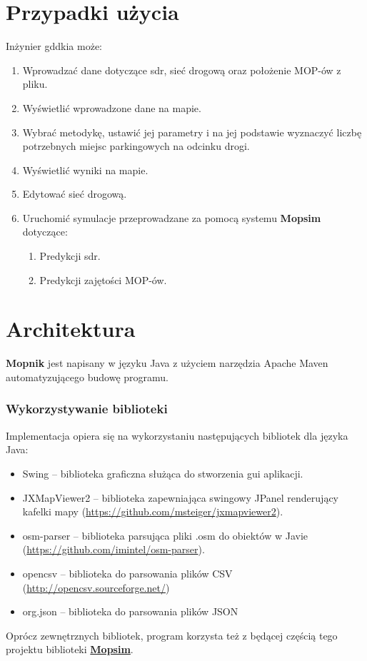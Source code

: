 \section{Przypadki użycia}
Inżynier \acrshort{gddkia} może:
\begin{enumerate}
  \item Wprowadzać dane dotyczące \acrshort{sdr}, sieć drogową oraz położenie MOP-ów z pliku.
  \item Wyświetlić wprowadzone dane na mapie.
  \item Wybrać metodykę, ustawić jej parametry i na jej podstawie wyznaczyć
    liczbę potrzebnych miejsc parkingowych na odcinku drogi.
  \item Wyświetlić wyniki na mapie.
  \item Edytować sieć drogową. 
  \item Uruchomić symulacje przeprowadzane za pomocą systemu
    \textbf{Mopsim} dotyczące:
    \begin{enumerate}
      \item Predykcji \acrshort{sdr}.
      \item Predykcji zajętości MOP-ów.
    \end{enumerate}
\end{enumerate}

\section{Architektura}
\textbf{Mopnik} jest napisany w języku Java z użyciem narzędzia Apache
Maven automatyzującego budowę programu.
\subsubsection{Wykorzystywanie biblioteki}
Implementacja opiera się na wykorzystaniu następujących bibliotek dla języka
Java:
\begin{itemize}
\item Swing -- biblioteka graficzna służąca do stworzenia \acrshort{gui} aplikacji.
\item JXMapViewer2 -- biblioteka zapewniająca swingowy JPanel renderujący
  kafelki mapy (\url{https://github.com/msteiger/jxmapviewer2}).
\item osm-parser -- biblioteka parsująca pliki .osm do obiektów w Javie
  (\url{https://github.com/imintel/osm-parser}).
\item opencsv -- biblioteka do parsowania plików CSV
  (\url{http://opencsv.sourceforge.net/})
\item org.json -- biblioteka do parsowania plików JSON 
\end{itemize}
Oprócz zewnętrznych bibliotek, program korzysta też z będącej częścią tego
projektu biblioteki \hyperref[r:mopsim]{\textbf{Mopsim}}. 
